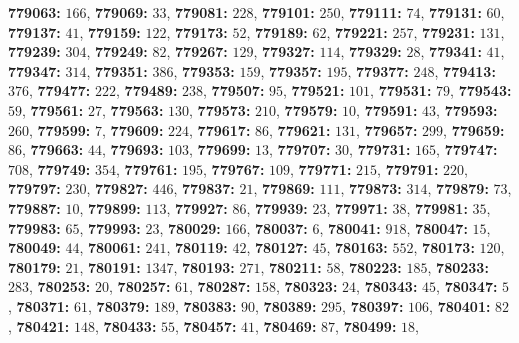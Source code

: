 \textsf{\bfseries 779063:} $166$, \textsf{\bfseries 779069:} $33$, \textsf{\bfseries 779081:} $228$, \textsf{\bfseries 779101:} $250$, \textsf{\bfseries 779111:} $74$, \textsf{\bfseries 779131:} $60$, \textsf{\bfseries 779137:} $41$, \textsf{\bfseries 779159:} $122$, \textsf{\bfseries 779173:} $52$, \textsf{\bfseries 779189:} $62$, \textsf{\bfseries 779221:} $257$, \textsf{\bfseries 779231:} $131$, \textsf{\bfseries 779239:} $304$, \textsf{\bfseries 779249:} $82$, \textsf{\bfseries 779267:} $129$, \textsf{\bfseries 779327:} $114$, \textsf{\bfseries 779329:} $28$, \textsf{\bfseries 779341:} $41$, \textsf{\bfseries 779347:} $314$, \textsf{\bfseries 779351:} $386$, \textsf{\bfseries 779353:} $159$, \textsf{\bfseries 779357:} $195$, \textsf{\bfseries 779377:} $248$, \textsf{\bfseries 779413:} $376$, \textsf{\bfseries 779477:} $222$, \textsf{\bfseries 779489:} $238$, \textsf{\bfseries 779507:} $95$, \textsf{\bfseries 779521:} $101$, \textsf{\bfseries 779531:} $79$, \textsf{\bfseries 779543:} $59$, \textsf{\bfseries 779561:} $27$, \textsf{\bfseries 779563:} $130$, \textsf{\bfseries 779573:} $210$, \textsf{\bfseries 779579:} $10$, \textsf{\bfseries 779591:} $43$, \textsf{\bfseries 779593:} $260$, \textsf{\bfseries 779599:} $7$, \textsf{\bfseries 779609:} $224$, \textsf{\bfseries 779617:} $86$, \textsf{\bfseries 779621:} $131$, \textsf{\bfseries 779657:} $299$, \textsf{\bfseries 779659:} $86$, \textsf{\bfseries 779663:} $44$, \textsf{\bfseries 779693:} $103$, \textsf{\bfseries 779699:} $13$, \textsf{\bfseries 779707:} $30$, \textsf{\bfseries 779731:} $165$, \textsf{\bfseries 779747:} $708$, \textsf{\bfseries 779749:} $354$, \textsf{\bfseries 779761:} $195$, \textsf{\bfseries 779767:} $109$, \textsf{\bfseries 779771:} $215$, \textsf{\bfseries 779791:} $220$, \textsf{\bfseries 779797:} $230$, \textsf{\bfseries 779827:} $446$, \textsf{\bfseries 779837:} $21$, \textsf{\bfseries 779869:} $111$, \textsf{\bfseries 779873:} $314$, \textsf{\bfseries 779879:} $73$, \textsf{\bfseries 779887:} $10$, \textsf{\bfseries 779899:} $113$, \textsf{\bfseries 779927:} $86$, \textsf{\bfseries 779939:} $23$, \textsf{\bfseries 779971:} $38$, \textsf{\bfseries 779981:} $35$, \textsf{\bfseries 779983:} $65$, \textsf{\bfseries 779993:} $23$, \textsf{\bfseries 780029:} $166$, \textsf{\bfseries 780037:} $6$, \textsf{\bfseries 780041:} $918$, \textsf{\bfseries 780047:} $15$, \textsf{\bfseries 780049:} $44$, \textsf{\bfseries 780061:} $241$, \textsf{\bfseries 780119:} $42$, \textsf{\bfseries 780127:} $45$, \textsf{\bfseries 780163:} $552$, \textsf{\bfseries 780173:} $120$, \textsf{\bfseries 780179:} $21$, \textsf{\bfseries 780191:} $1347$, \textsf{\bfseries 780193:} $271$, \textsf{\bfseries 780211:} $58$, \textsf{\bfseries 780223:} $185$, \textsf{\bfseries 780233:} $283$, \textsf{\bfseries 780253:} $20$, \textsf{\bfseries 780257:} $61$, \textsf{\bfseries 780287:} $158$, \textsf{\bfseries 780323:} $24$, \textsf{\bfseries 780343:} $45$, \textsf{\bfseries 780347:} $5$, \textsf{\bfseries 780371:} $61$, \textsf{\bfseries 780379:} $189$, \textsf{\bfseries 780383:} $90$, \textsf{\bfseries 780389:} $295$, \textsf{\bfseries 780397:} $106$, \textsf{\bfseries 780401:} $82$, \textsf{\bfseries 780421:} $148$, \textsf{\bfseries 780433:} $55$, \textsf{\bfseries 780457:} $41$, \textsf{\bfseries 780469:} $87$, \textsf{\bfseries 780499:} $18$, 
